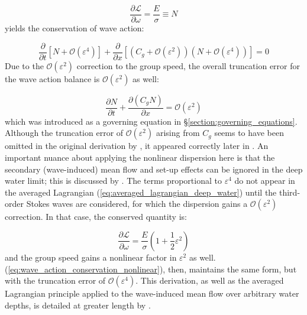 \documentclass[lineno]{jfm}
\begin{document}
\begin{equation}
  \frac{\partial \mathcal{L}}{\partial \omega} = \frac{E}{\sigma} \equiv N
  \label{eq:adiabatic1}
\end{equation}
yields the conservation of wave action:

\begin{equation}
  \frac{\partial}{\partial t} \left[ N + \mathcal{O}(\varepsilon^4) \right] +
  \frac{\partial}{\partial x} \left[ (C_g + \mathcal{O}(\varepsilon^2)) (N + \mathcal{O}(\varepsilon^4)) \right] = 0
\end{equation}
Due to the $\mathcal{O}(\varepsilon^2)$ correction to the group speed, the
overall truncation error for the wave action balance is $\mathcal{O}(\varepsilon^2)$
as well:

\begin{equation}
  \frac{\partial N}{\partial t} +
  \frac{\partial (C_g N)}{\partial x} = \mathcal{O}(\varepsilon^2)
  \label{eq:wave_action_conservation_nonlinear}
\end{equation}
which was introduced as a governing equation in \S\ref{section:governing_equations}.
Although the truncation error of $\mathcal{O}(\varepsilon^2)$ arising from $C_g$
seems to have been omitted in the original derivation by \citet{whitham1967non},
it appeared correctly later in \citet{whitham1974linear}.
An important nuance about applying the nonlinear dispersion here is that the
secondary (wave-induced) mean flow and set-up effects can be ignored in the
deep water limit; this is discussed by \citet{whitham1974dispersive}.
The terms proportional to $\varepsilon^4$ do not appear in the averaged Lagrangian
(\ref{eq:averaged_lagrangian_deep_water}) until the third-order Stokes waves
are considered, for which the dispersion gains a $\mathcal{O}(\varepsilon^2)$
correction.
In that case, the conserved quantity is:

\begin{equation}
  \frac{\partial \mathcal{L}}{\partial \omega} = \frac{E}{\sigma} (1 + \frac{1}{2} \varepsilon^2)
  \label{eq:adiabatic2}
\end{equation}
and the group speed gains a nonlinear factor in $\varepsilon^2$ as well.
(\ref{eq:wave_action_conservation_nonlinear}), then, maintains the same form,
but with the truncation error of $\mathcal{O}(\varepsilon^4)$.
This derivation, as well as the averaged Lagrangian principle applied to the
wave-induced mean flow over arbitrary water depths, is detailed at greater length
by \citet{whitham1967non}.
\end{document}
